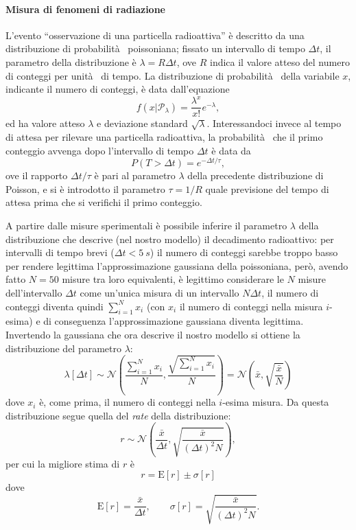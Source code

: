 \documentclass[10pt,oneside,a4paper]{article}
\begin{document}
\paragraph{Misura di fenomeni di radiazione}
L'evento ``osservazione di una particella radioattiva'' è descritto da una distribuzione di probabilità  poissoniana; fissato un intervallo di tempo $\Delta t$, il parametro della distribuzione è $\lambda = R\Delta t$, ove $R$ indica il valore atteso del numero di conteggi per unità  di tempo. La distribuzione di probabilità  della variabile $x$, indicante il numero di conteggi, è data dall'equazione
\begin{equation}\label{eq:Poisson}
f(x\vert \mathcal{P}_{\lambda}) = \frac{\lambda^x}{x!}e^{-\lambda},
\end{equation}
ed ha valore atteso $\lambda$ e deviazione standard $\sqrt{\lambda}$.
Interessandoci invece al tempo di attesa per rilevare una particella radioattiva, la probabilità  che il primo conteggio avvenga dopo l'intervallo di tempo $\Delta t$ è data da
\[
P(T > \Delta t) = e^{-\Delta t / \tau},
\]
ove il rapporto $\Delta t / \tau$ è pari al parametro $\lambda$ della precedente distribuzione di Poisson, e si è introdotto il parametro $\tau = 1 / R$ quale previsione del tempo di attesa prima che si verifichi il primo conteggio. 

A partire dalle misure sperimentali è possibile inferire il parametro $\lambda$ della distribuzione che descrive (nel nostro modello) il decadimento radioattivo: per intervalli di tempo brevi ($\Delta t < \SI{5}{s}$) il numero di conteggi sarebbe troppo basso per rendere legittima l'approssimazione gaussiana della poissoniana, però, avendo fatto $N = 50$ misure tra loro equivalenti, è legittimo considerare le $N$ misure dell'intervallo $\Delta t$ come un'unica misura di un intervallo $N \Delta t$, il numero di conteggi diventa quindi $\sum_{i=1}^N x_i$ (con $x_i$ il numero di conteggi nella misura $i$-esima) e di conseguenza l'approssimazione gaussiana diventa legittima. Invertendo la gaussiana che ora descrive il nostro modello si ottiene la distribuzione del parametro $\lambda$:
\begin{equation}\label{eq:distribuzione_lambda}
	\lambda[\Delta t]  \sim \mathscr{N} \left( \frac{\sum_{i=1}^N x_i}{N} , \frac{\sqrt{\sum_{i=1}^N x_i}}{N} \right) = \mathscr{N} \left( \bar{x}, \sqrt{\frac{\bar{x}}{N}} \right)
\end{equation}
dove $x_i$ è, come prima, il numero di conteggi nella $i$-esima misura. Da questa distribuzione segue quella del \emph{rate} della distribuzione:
\begin{equation}\label{eq:distribuzione_r}
	r \sim \mathscr{N} \left( \frac{\bar{x}}{\Delta t}, \sqrt{\frac{\bar{x}}{(\Delta t)^2 N}} \right),
\end{equation}
per cui la migliore stima di $r$ è
\begin{equation}\label{eq:stima_r}
	r = \mathrm{E}[r] \pm \sigma [r]
\end{equation} dove
\[
	\mathrm{E}[r] = \frac{\bar{x}}{\Delta t}, \qquad \sigma [r] = \sqrt{\frac{\bar{x}}{(\Delta t)^2 N}}.
\]
\end{document}
